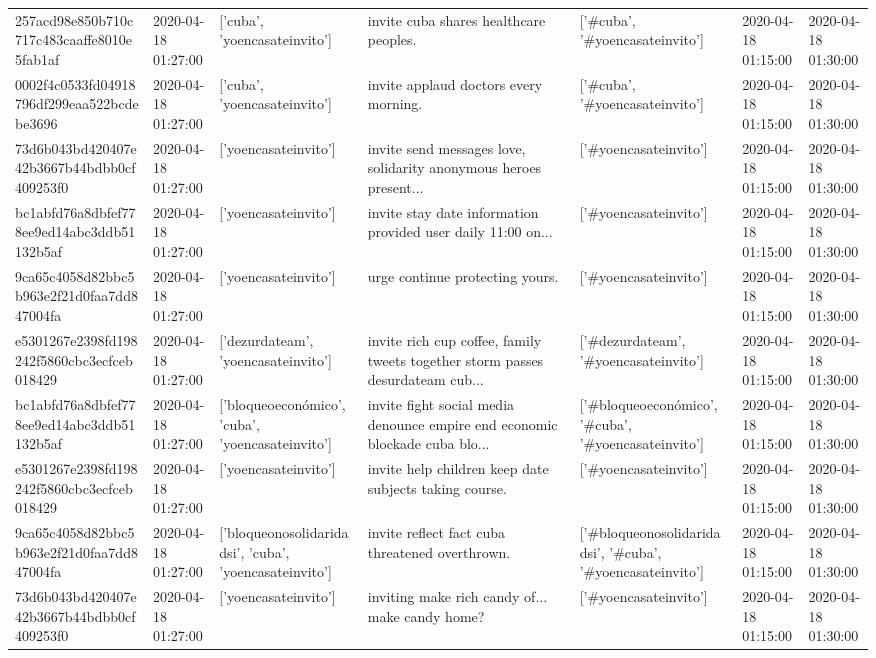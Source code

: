 \begin{tabular}{lllllll}
257acd98e850b710c717c483caaffe8010e5fab1af & 2020-04-18 01:27:00 & ['cuba', 'yoencasateinvito'] & invite cuba shares healthcare peoples. & ['#cuba', '#yoencasateinvito'] & 2020-04-18 01:15:00 & 2020-04-18 01:30:00 \\
0002f4c0533fd04918796df299eaa522bcdebe3696 & 2020-04-18 01:27:00 & ['cuba', 'yoencasateinvito'] & invite applaud doctors every morning. & ['#cuba', '#yoencasateinvito'] & 2020-04-18 01:15:00 & 2020-04-18 01:30:00 \\
73d6b043bd420407e42b3667b44bdbb0cf409253f0 & 2020-04-18 01:27:00 & ['yoencasateinvito'] & invite send messages love, solidarity anonymous heroes present... & ['#yoencasateinvito'] & 2020-04-18 01:15:00 & 2020-04-18 01:30:00 \\
bc1abfd76a8dbfef778ee9ed14abc3ddb51132b5af & 2020-04-18 01:27:00 & ['yoencasateinvito'] & invite stay date information provided user daily 11:00 on... & ['#yoencasateinvito'] & 2020-04-18 01:15:00 & 2020-04-18 01:30:00 \\
9ca65c4058d82bbc5b963e2f21d0faa7dd847004fa & 2020-04-18 01:27:00 & ['yoencasateinvito'] & urge continue protecting yours. & ['#yoencasateinvito'] & 2020-04-18 01:15:00 & 2020-04-18 01:30:00 \\
e5301267e2398fd198242f5860cbc3ecfceb018429 & 2020-04-18 01:27:00 & ['dezurdateam', 'yoencasateinvito'] & invite rich cup coffee, family tweets together storm passes desurdateam cub... & ['#dezurdateam', '#yoencasateinvito'] & 2020-04-18 01:15:00 & 2020-04-18 01:30:00 \\
bc1abfd76a8dbfef778ee9ed14abc3ddb51132b5af & 2020-04-18 01:27:00 & ['bloqueoeconómico', 'cuba', 'yoencasateinvito'] & invite fight social media denounce empire end economic blockade cuba blo... & ['#bloqueoeconómico', '#cuba', '#yoencasateinvito'] & 2020-04-18 01:15:00 & 2020-04-18 01:30:00 \\
e5301267e2398fd198242f5860cbc3ecfceb018429 & 2020-04-18 01:27:00 & ['yoencasateinvito'] & invite help children keep date subjects taking course. & ['#yoencasateinvito'] & 2020-04-18 01:15:00 & 2020-04-18 01:30:00 \\
9ca65c4058d82bbc5b963e2f21d0faa7dd847004fa & 2020-04-18 01:27:00 & ['bloqueonosolidaridadsi', 'cuba', 'yoencasateinvito'] & invite reflect fact cuba threatened overthrown. & ['#bloqueonosolidaridadsi', '#cuba', '#yoencasateinvito'] & 2020-04-18 01:15:00 & 2020-04-18 01:30:00 \\
73d6b043bd420407e42b3667b44bdbb0cf409253f0 & 2020-04-18 01:27:00 & ['yoencasateinvito'] & inviting make rich candy of... make candy home? & ['#yoencasateinvito'] & 2020-04-18 01:15:00 & 2020-04-18 01:30:00 \\

\end{tabular}
